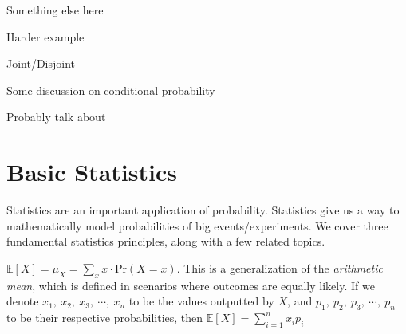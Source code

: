 \documentclass[main.tex]{subfiles}
\begin{document}
\begin{example}
	
\end{example}

Something else here

\begin{example}
	Harder example
\end{example}

Joint/Disjoint

\begin{defn}
	
\end{defn}

\begin{defn}
	
\end{defn}

Some discussion on conditional probability

\begin{defn}
	
\end{defn}

\begin{defn}
	
\end{defn}

Probably talk about 

\section{Basic Statistics}

Statistics are an important application of probability. Statistics give us a way to mathematically model probabilities of big events/experiments. We cover three fundamental statistics principles, along with a few related topics.

\begin{defn}
	\(\mathbb{E}[X] = \mu_X = \sum_{x}^{} x \cdot \mathrm{Pr}(X = x)\). This is a generalization of the \textit{arithmetic mean}, which is defined in scenarios where outcomes are equally likely. If we denote \(x_1,\ x_2,\ x_3,\ \cdots,\ x_n\) to be the values outputted by \(X\), and \(p_1,\ p_2,\ p_3,\ \cdots,\ p_n\) to be their respective probabilities, then \(\mathbb{E}[X] = \sum_{i=1}^{n} x_i p_i\)
\end{defn}
\end{document}
